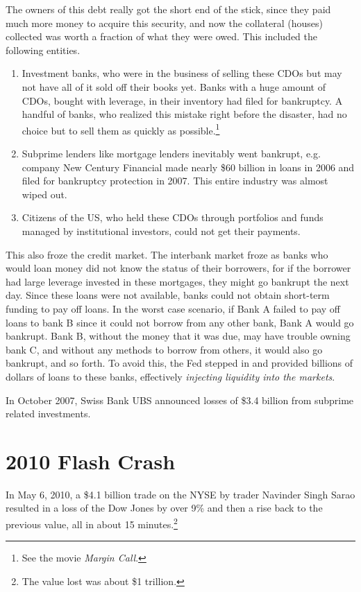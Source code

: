 \documentclass{article}
\begin{document}
  The owners of this debt really got the short end of the stick, since they paid much more money to acquire this security, and now the collateral (houses) collected was worth a fraction of what they were owed. This included the following entities. 
  \begin{enumerate}
    \item Investment banks, who were in the business of selling these CDOs but may not have all of it sold off their books yet. Banks with a huge amount of CDOs, bought with leverage, in their inventory had filed for bankruptcy. A handful of banks, who realized this mistake right before the disaster, had no choice but to sell them as quickly as possible.\footnote{See the movie \textit{Margin Call}. } 
    \item Subprime lenders like mortgage lenders inevitably went bankrupt, e.g. company New Century Financial made nearly \$60 billion in loans in 2006 and filed for bankruptcy protection in 2007. This entire industry was almost wiped out. 
    \item Citizens of the US, who held these CDOs through portfolios and funds managed by institutional investors, could not get their payments. 
  \end{enumerate}
  This also froze the credit market. The interbank market froze as banks who would loan money did not know the status of their borrowers, for if the borrower had large leverage invested in these mortgages, they might go bankrupt the next day. Since these loans were not available, banks could not obtain short-term funding to pay off loans. In the worst case scenario, if Bank A failed to pay off loans to bank B since it could not borrow from any other bank, Bank A would go bankrupt. Bank B, without the money that it was due, may have trouble owning bank C, and without any methods to borrow from others, it would also go bankrupt, and so forth. To avoid this, the Fed stepped in and provided billions of dollars of loans to these banks, effectively \textit{injecting liquidity into the markets}. 

  In October 2007, Swiss Bank UBS announced losses of \$3.4 billion from subprime related investments. 

\section{2010 Flash Crash}

  In May 6, 2010, a \$4.1 billion trade on the NYSE by trader Navinder Singh Sarao resulted in a loss of the Dow Jones by over 9\% and then a rise back to the previous value, all in about 15 minutes.\footnote{The value lost was about \$1 trillion.} 
\end{document}
